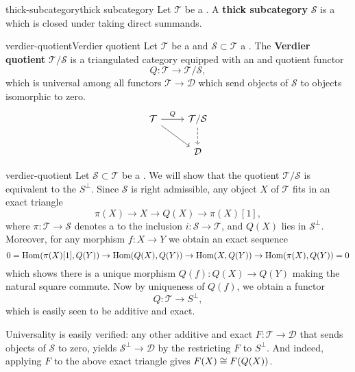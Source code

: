 \begin{topic}{thick-subcategory}{thick subcategory}
    Let $\mathcal{T}$ be a . A \textbf{thick subcategory} $\mathcal{S}$ is a   which is closed under taking direct summands.
\end{topic}

\begin{topic}{verdier-quotient}{Verdier quotient}
    Let $\mathcal{T}$ be a  and $\mathcal{S} \subset \mathcal{T}$ a . The \textbf{Verdier quotient} $\mathcal{T}/\mathcal{S}$ is a triangulated category equipped with an  and  quotient functor
    \[ Q \colon \mathcal{T} \to \mathcal{T}/\mathcal{S} , \]
    which is universal among all functors $\mathcal{T} \to \mathcal{D}$ which send objects of $\mathcal{S}$ to objects isomorphic to zero.
    \[ \svg \begin{tikzcd} \mathcal{T} \arrow{r}{Q} \arrow{rd} & \mathcal{T} / \mathcal{S} \arrow[dashed]{d} \\ & \mathcal{D} \end{tikzcd} \]
\end{topic}

\begin{example}{verdier-quotient}
    Let $\mathcal{S} \subset \mathcal{T}$ be a . We will show that the quotient $\mathcal{T}/\mathcal{S}$ is equivalent to the  $S^\perp$. Since $\mathcal{S}$ is right admissible, any object $X$ of $\mathcal{T}$ fits in an exact triangle
    \[ \pi(X) \to X \to Q(X) \to \pi(X)[1] , \]
    where $\pi \colon \mathcal{T} \to \mathcal{S}$ denotes a  to the inclusion $i \colon \mathcal{S} \to \mathcal{T}$, and $Q(X)$ lies in $\mathcal{S}^\perp$. Moreover, for any morphism $f \colon X \to Y$ we obtain an exact sequence
    \[ 0 = \operatorname{Hom}(\pi(X)[1], Q(Y)) \to \operatorname{Hom}(Q(X), Q(Y)) \to \operatorname{Hom}(X, Q(Y)) \to \operatorname{Hom}(\pi(X), Q(Y)) = 0 \]
    which shows there is a unique morphism $Q(f) \colon Q(X) \to Q(Y)$ making the natural square commute.
    Now by uniqueness of $Q(f)$, we obtain a functor
    \[ Q \colon \mathcal{T} \to S^\perp , \]
    which is easily seen to be additive and exact.
    
    Universality is easily verified: any other additive and exact $F \colon \mathcal{T} \to \mathcal{D}$ that sends objects of $\mathcal{S}$ to zero, yields $\mathcal{S}^\perp \to \mathcal{D}$ by the restricting $F$ to $S^\perp$. And indeed, applying $F$ to the above exact triangle gives $F(X) \cong F(Q(X))$.
\end{example}

